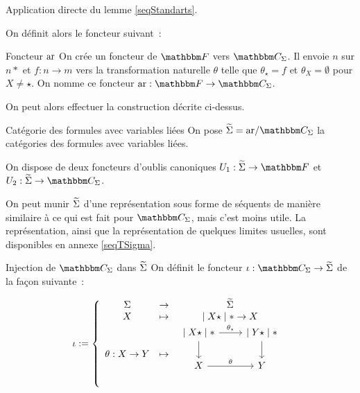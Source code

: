 \begin{pv}
    Application directe du lemme \ref{seqStandarts}.
\end{pv}

On définit alors le foncteur suivant~:

\begin{defi}{Foncteur $\text{ar}$}
    On crée un foncteur de $\cf$ vers $\C_\Sigma$. Il envoie $n$ sur $n\ast$ et
    $f : n\rightarrow m$ vers la transformation naturelle $\theta$ telle que
    $\theta_\star = f$ et $\theta_X = \emptyset$ pour $X\neq\star$. On nomme ce
    foncteur $\arf : \cf\rightarrow\C_\Sigma$.
\end{defi}

On peut alors effectuer la construction décrite ci-dessus.

\begin{defi}{Catégorie des formules avec variables liées}
    On pose $\tsigma = \arf/\C_\Sigma$ la catégories des formules avec variables
    liées.

    On dispose de deux foncteurs d'oublis canoniques $U_1 : \tsigma\rightarrow\cf$
    et $U_2 : \tsigma\rightarrow\C_\Sigma$.
\end{defi}

On peut munir $\widetilde{\Sigma}$ d'une représentation sous forme de séquents de manière
similaire à ce qui est fait pour $\C_\Sigma$, mais c'est moins utile. La représentation,
ainsi que la représentation de quelques limites usuelles, sont disponibles en
annexe \ref{seqTSigma}.

\begin{defi}{Injection de $\C_\Sigma$ dans $\widetilde{\Sigma}$}
    On définit le foncteur $\iota:\C_\Sigma\rightarrow\tsigma$ de la façon suivante~:

    \[ \iota := \left\{\begin{array}{ccc}
        \Sigma & \rightarrow & \tsigma \\
        X      & \mapsto     & \mid X\star\mid\ast\rightarrow X \\
        \theta : X\rightarrow Y & \mapsto &
            \begin{tikzcd}
                \mid X\star\mid\ast\arrow[d]
                                   \arrow[r, "\theta_\star"]
                    & \mid Y\star\mid\ast\arrow[d] \\
                X\arrow[r, "\theta"]
                    & Y \\
            \end{tikzcd} \\
    \end{array}\right. \]
\end{defi}

